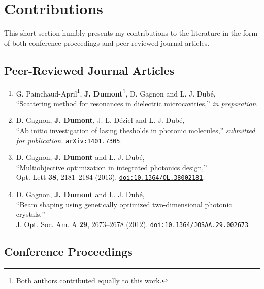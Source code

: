 \chapter*{Contributions}
This short section humbly presents my contributions to the 
literature in the form of both conference proceedings and 
peer-reviewed journal articles. 

\section*{Peer-Reviewed Journal Articles}
\renewcommand*{\thefootnote}{\fnsymbol{footnote}}

\begin{enumerate}
 \item[\cite{GAP2014}] G. Painchaud-April\footnote{\label{note1}Both authors contributed equally to this work.}, 
	\textbf{J. Dumont}\textsuperscript{\ref{note1}}, D. Gagnon and L. J. Dubé,\\ 
	``Scattering method for resonances in dielectric microcavities,'' \textit{in preparation}.
  \item[\cite{GAG2014a}] D. Gagnon, \textbf{J. Dumont}, J.-L. Déziel and L. J. Dubé, \\
	``Ab initio investigation of lasing thesholds in photonic molecules,'' \textit{submitted for publication.}
	\href{http://arxiv.og/abs/1401.7305}{\texttt{arXiv:1401.7305}}.
  \item[\cite{GAG2013c}]D. Gagnon, \textbf{J. Dumont} and L. J. Dubé, \\
	``Multiobjective optimization in integrated photonics design,''\\
	Opt. Lett \textbf{38}, 2181--2184 (2013). 
	\href{http://dx.doi.org/10.1364/OL.38002181}{\texttt{doi:10.1364/OL.38002181}}.
  \item[\cite{GAG2012}]D. Gagnon, \textbf{J. Dumont} and L. J. Dubé, \\
	``Beam shaping using genetically optimized two-dimensional photonic crystals,''\\
	J. Opt. Soc. Am. A \textbf{29}, 2673--2678 (2012). 
	\href{http://dx.doi.org/10.1364/JOSAA.29.002673}{\texttt{doi:10.1364/JOSAA.29.002673}}
\end{enumerate}

\clearpage
\section*{Conference Proceedings}
\renewcommand*{\thefootnote}{\roman{footnote}}
\setcounter{footnote}{0}

